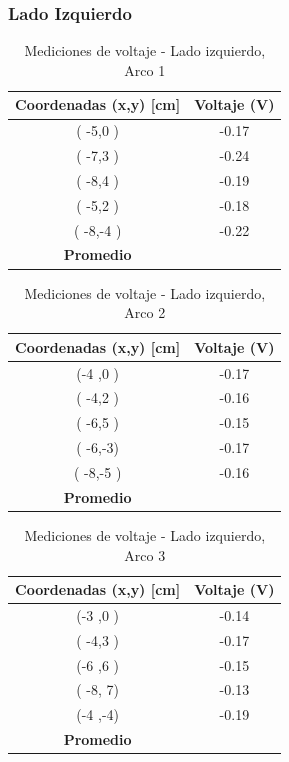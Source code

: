 \documentclass[11pt,twocolumn]{article}
\begin{document}
\subsubsection*{Lado Izquierdo}
\begin{table}[h]

\centering
\caption{Mediciones de voltaje - Lado izquierdo, Arco 1}
\begin{tabular}{cc}
\toprule
\textbf{Coordenadas (x,y) [cm]} & \textbf{Voltaje (V)} \\
\midrule
( -5,0 ) &  -0.17\\
( -7,3 ) &  -0.24\\
( -8,4 ) &  -0.19\\
( -5,2 ) &  -0.18\\
( -8,-4 ) & -0.22 \\
\midrule
\textbf{Promedio} &  \\
\bottomrule
\end{tabular}
\end{table}

\begin{table}[h]
\centering
\caption{Mediciones de voltaje - Lado izquierdo, Arco 2}
\begin{tabular}{cc}
\toprule
\textbf{Coordenadas (x,y) [cm]} & \textbf{Voltaje (V)} \\
\midrule
(-4 ,0 ) &  -0.17\\
( -4,2 ) &  -0.16\\
( -6,5 ) &  -0.15\\
( -6,-3) &  -0.17\\
( -8,-5 ) & -0.16 \\
\midrule
\textbf{Promedio} &  \\
\bottomrule
\end{tabular}
\end{table}

\begin{table}[h]
\centering
\caption{Mediciones de voltaje - Lado izquierdo, Arco 3}
\begin{tabular}{cc}
\toprule
\textbf{Coordenadas (x,y) [cm]} & \textbf{Voltaje (V)} \\
\midrule
(-3 ,0 ) & -0.14 \\
( -4,3 ) & -0.17 \\
(-6 ,6 ) & -0.15 \\
( -8, 7) & -0.13 \\
(-4 ,-4) & -0.19 \\
\midrule
\textbf{Promedio} &  \\
\bottomrule
\end{tabular}
\end{table}
\end{document}
